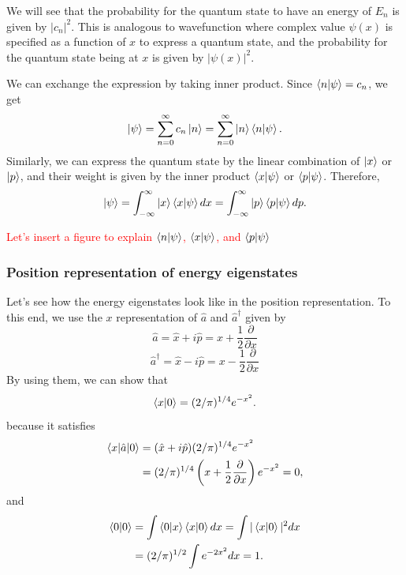 We will see that the probability for the quantum state to have an energy of $E_n$ is given by $|c_n|^2$. This is analogous to wavefunction where complex value $\psi(x)$ is specified as a function of $x$ to express a quantum state, and the probability for the quantum state being at $x$ is given by $|\psi(x)|^2$.

We can exchange the expression by taking inner product. Since $\braket {n|\psi} = c_n$, we get
\begin{equation}
  \ket \psi = \sum_{n=0}^{\infty}c_n\ket n = \sum_{n=0}^{\infty}\ket n \braket{n|\psi}.
\end{equation}
Similarly, we can express the quantum state by the linear combination of $\ket x$ or $\ket p$, and their weight is given by the inner product $\braket {x|\psi}$ or $\braket{p|\psi}$. Therefore,
\begin{equation}
  \ket \psi = \int_{-\infty}^{\infty}\ket x \braket{x|\psi}dx = \int_{-\infty}^{\infty}\ket p \braket {p|\psi}dp.
\end{equation}


\textcolor{red}{Let's insert a figure to explain $\braket {n|\psi}$, $\braket {x|\psi}$, and $\braket{p|\psi}$}

\subsubsection{Position representation of energy eigenstates}
Let's see how the energy eigenstates look like in the position representation. To this end, we use the $x$ representation of $\hat a$ and $\hat a^\dagger$ given by
\begin{equation}
  \hat a = \hat x + i\hat p = x + \frac{1}{2}\frac{\partial}{\partial x}
  \label{eq:annihilation_in_x}
\end{equation}
\begin{equation}
  \hat a^\dagger = \hat x - i\hat p = x - \frac{1}{2}\frac{\partial}{\partial x}
  \label{eq:creation_in_x}
\end{equation}
By using them, we can show that 
\begin{equation}
  \braket{x|0}=(2/\pi)^{1/4}e^{-x^2}.
  \label{eq:braket_x_0}
\end{equation}
because it satisfies
\begin{equation}
\begin{aligned}
  \braket{x|\hat a|0} &= (\hat x + i\hat p)(2/\pi)^{1/4}e^{-x^2}\\
  &= (2 / \pi)^{1/4}\left(x + \frac{1}{2}\frac{\partial}{\partial x}\right)e^{-x^2} = 0,
\end{aligned}
\end{equation}
and
\begin{equation}
\begin{aligned}
  \braket{0|0} &= \int \braket{0|x}\braket{x|0}dx = \int |\braket{x|0}|^2dx\\
  &= (2/\pi)^{1/2}\int e^{-2x^2}dx = 1.
\end{aligned}
\end{equation}

